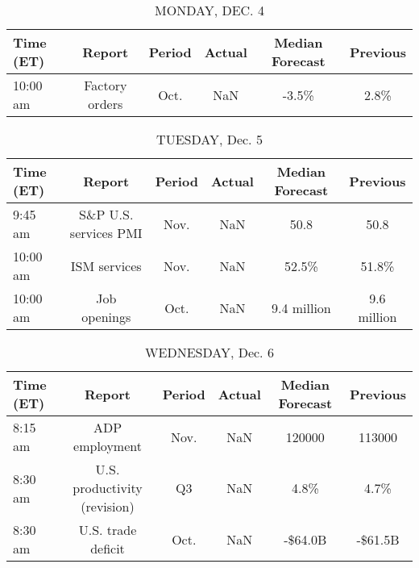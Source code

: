 \documentclass{article}%
\begin{document}
%
\normalsize%


\begin{table}[htbp]%
\caption{MONDAY, DEC. 4}%
\centering%
\begin{adjustbox}{width=1\textwidth}%
\begin{tabular}{lccccc}
\toprule
Time (ET) &         Report & Period & Actual & Median Forecast & Previous \\
\midrule
 10:00 am & Factory orders &   Oct. &    NaN &           -3.5\% &     2.8\% \\
\bottomrule
\end{tabular}
%
\end{adjustbox}%
\end{table}

%


\begin{table}[htbp]%
\caption{TUESDAY, Dec. 5}%
\centering%
\begin{adjustbox}{width=1\textwidth}%
\begin{tabular}{lccccc}
\toprule
Time (ET) &                Report & Period & Actual & Median Forecast &    Previous \\
\midrule
  9:45 am & S\&P U.S. services PMI &   Nov. &    NaN &            50.8 &        50.8 \\
 10:00 am &          ISM services &   Nov. &    NaN &           52.5\% &       51.8\% \\
 10:00 am &          Job openings &   Oct. &    NaN &     9.4 million & 9.6 million \\
\bottomrule
\end{tabular}
%
\end{adjustbox}%
\end{table}

%


\begin{table}[htbp]%
\caption{WEDNESDAY, Dec. 6}%
\centering%
\begin{adjustbox}{width=1\textwidth}%
\begin{tabular}{lccccc}
\toprule
Time (ET) &                       Report & Period & Actual & Median Forecast & Previous \\
\midrule
  8:15 am &               ADP employment &   Nov. &    NaN &          120000 &   113000 \\
  8:30 am & U.S. productivity (revision) &     Q3 &    NaN &            4.8\% &     4.7\% \\
  8:30 am &           U.S. trade deficit &   Oct. &    NaN &         -\$64.0B &  -\$61.5B \\
\bottomrule
\end{tabular}
%
\end{adjustbox}%
\end{table}
\end{document}
